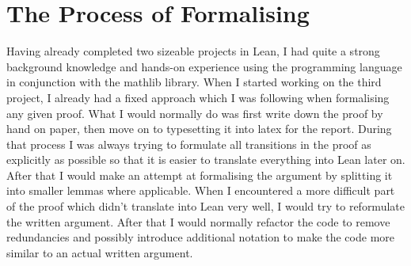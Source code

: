 \documentclass[11pt]{article}
\begin{document}
\section*{The Process of Formalising}

Having already completed two sizeable projects in Lean, I had quite a strong
background knowledge and hands-on experience using the programming language in
conjunction with the mathlib library. When I started working on the third
project, I already had a fixed approach which I was following when formalising
any given proof. What I would normally do was first write down the proof by
hand on paper, then move on to typesetting it into latex for the report. During
that process I was always trying to formulate all transitions in the proof as
explicitly as possible so that it is easier to translate everything into Lean
later on. After that I would make an attempt at formalising the argument by
splitting it into smaller lemmas where applicable. When I encountered a more
difficult part of the proof which didn't translate into Lean very well, I would
try to reformulate the written argument. After that I would normally refactor
the code to remove redundancies and possibly introduce additional notation to
make the code more similar to an actual written argument.
\end{document}
